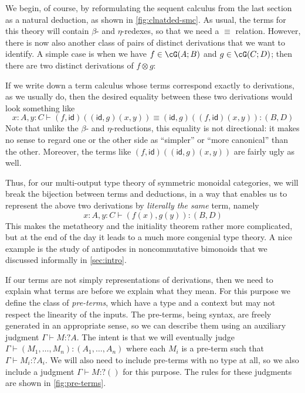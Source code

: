 \documentclass{book}
\let\types\vdash
\def\idfunc{\mathsf{id}}
\let\tensor\otimes
\begin{document}
We begin, of course, by reformulating the sequent calculus from the last section as a natural deduction, as shown in \cref{fig:clnatded-smc}.
As usual, the terms for this theory will contain $\beta$- and $\eta$-redexes, so that we need a $\equiv$ relation.
However, there is now also another class of pairs of distinct derivations that we want to identify.
A simple case is when we have $f\in \cG(A;B)$ and $g\in\cG(C;D)$; then there are two distinct derivations of $f\tensor g$:
If we write down a term calculus whose terms correspond exactly to derivations, as we usually do, then the desired equality between these two derivations would look something like
\[ x:A, y:C \types (f,\idfunc)((\idfunc,g)(x,y)) \equiv (\idfunc,g)((f,\idfunc)(x,y)) : (B,D) \]
Note that unlike the $\beta$- and $\eta$-reductions, this equality is not directional: it makes no sense to regard one or the other side as ``simpler'' or ``more canonical'' than the other.
Moreover, the terms like $(f,\idfunc)((\idfunc,g)(x,y))$ are fairly ugly as well.

Thus, for our multi-output type theory of symmetric monoidal categories, we will break the bijection between terms and deductions, in a way that enables us to represent the above two derivations by \emph{literally the same} term, namely
\[ x:A, y:C \types (f(x),g(y)):(B,D) \]
This makes the metatheory and the initiality theorem rather more complicated, but at the end of the day it leads to a much more congenial type theory.
A nice example is the study of antipodes in noncommutative bimonoids that we discussed informally in \cref{sec:intro}.

If our terms are not simply representations of derivations, then we need to explain what terms are before we explain what they mean.
For this purpose we define the class of \emph{pre-terms}, which have a type and a context but may not respect the linearity of the inputs.
\newcommand{\pc}{\mathrel{\mathord{:}?}}
The pre-terms, being syntax, are freely generated in an appropriate sense, so we can describe them using an auxiliary judgment $\Gamma \types M\pc A$.
The intent is that we will eventually judge $\Gamma \types (M_1,\dots,M_n):(A_1,\dots,A_n)$ where each $M_i$ is a pre-term such that $\Gamma \types M_i\pc A_i$.
We will also need to include pre-terms with no type at all, so we also include a judgment $\Gamma \types M\pc ()$ for this purpose.
The rules for these judgments are shown in \cref{fig:pre-terms}.
\end{document}
